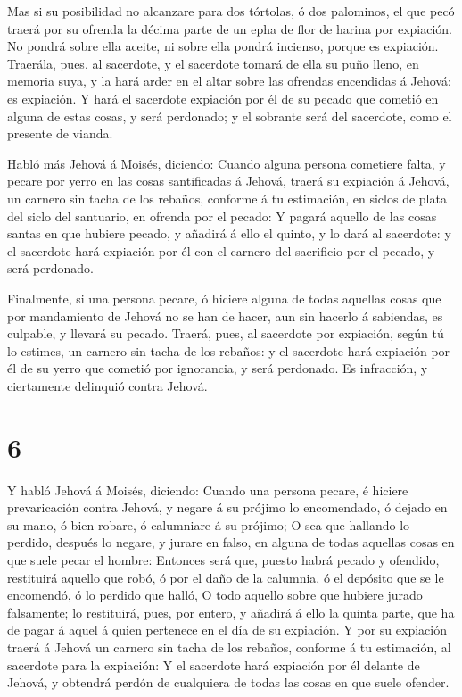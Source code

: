  Mas si su posibilidad no alcanzare para dos tórtolas, ó
dos palominos, el que pecó traerá por su ofrenda la décima parte de un
epha de flor de harina por expiación. No pondrá sobre ella aceite, ni
sobre ella pondrá incienso, porque es expiación.  Traerála,
pues, al sacerdote, y el sacerdote tomará de ella su puño lleno, en
memoria suya, y la hará arder en el altar sobre las ofrendas encendidas
á Jehová: es expiación.  Y hará el sacerdote expiación por
él de su pecado que cometió en alguna de estas cosas, y será perdonado;
y el sobrante será del sacerdote, como el presente de vianda.

 Habló más Jehová á Moisés, diciendo:  Cuando
alguna persona cometiere falta, y pecare por yerro en las cosas
santificadas á Jehová, traerá su expiación á Jehová, un carnero sin
tacha de los rebaños, conforme á tu estimación, en siclos de plata del
siclo del santuario, en ofrenda por el pecado:  Y pagará
aquello de las cosas santas en que hubiere pecado, y añadirá á ello el
quinto, y lo dará al sacerdote: y el sacerdote hará expiación por él con
el carnero del sacrificio por el pecado, y será perdonado.

 Finalmente, si una persona pecare, ó hiciere alguna de
todas aquellas cosas que por mandamiento de Jehová no se han de hacer,
aun sin hacerlo á sabiendas, es culpable, y llevará su pecado.
 Traerá, pues, al sacerdote por expiación, según tú lo
estimes, un carnero sin tacha de los rebaños: y el sacerdote hará
expiación por él de su yerro que cometió por ignorancia, y será
perdonado.  Es infracción, y ciertamente delinquió contra
Jehová.

\hypertarget{section-5}{%
\section{6}\label{section-5}}

 Y habló Jehová á Moisés, diciendo:  Cuando una
persona pecare, é hiciere prevaricación contra Jehová, y negare á su
prójimo lo encomendado, ó dejado en su mano, ó bien robare, ó calumniare
á su prójimo;  O sea que hallando lo perdido, después lo
negare, y jurare en falso, en alguna de todas aquellas cosas en que
suele pecar el hombre:  Entonces será que, puesto habrá
pecado y ofendido, restituirá aquello que robó, ó por el daño de la
calumnia, ó el depósito que se le encomendó, ó lo perdido que halló,
 O todo aquello sobre que hubiere jurado falsamente; lo
restituirá, pues, por entero, y añadirá á ello la quinta parte, que ha
de pagar á aquel á quien pertenece en el día de su expiación.
 Y por su expiación traerá á Jehová un carnero sin tacha de
los rebaños, conforme á tu estimación, al sacerdote para la expiación:
 Y el sacerdote hará expiación por él delante de Jehová, y
obtendrá perdón de cualquiera de todas las cosas en que suele ofender.

